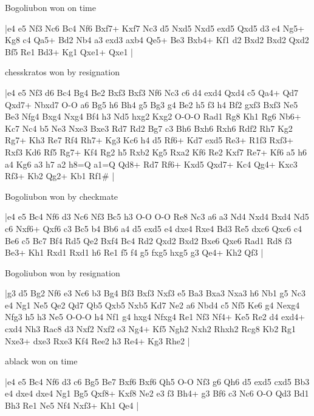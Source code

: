 \showboard

Bogoliubon won on time

\makegametitle
|e4 e5 Nf3 Nc6 Bc4 Nf6 Bxf7+ Kxf7 Nc3 d5 Nxd5 Nxd5 exd5 Qxd5 d3 e4 Ng5+ Kg8 c4 Qa5+ Bd2 Nb4 a3 exd3 axb4 Qe5+ Be3 Bxb4+ Kf1 d2 Bxd2 Bxd2 Qxd2 Bf5 Re1 Bd3+ Kg1 Qxe1+ Qxe1  |

\showboard

chesskratos won by resignation

\makegametitle
|e4 e5 Nf3 d6 Bc4 Bg4 Be2 Bxf3 Bxf3 Nf6 Nc3 c6 d4 exd4 Qxd4 c5 Qa4+ Qd7 Qxd7+ Nbxd7 O-O a6 Bg5 h6 Bh4 g5 Bg3 g4 Be2 h5 f3 h4 Bf2 gxf3 Bxf3 Ne5 Be3 Nfg4 Bxg4 Nxg4 Bf4 h3 Nd5 hxg2 Kxg2 O-O-O Rad1 Rg8 Kh1 Rg6 Nb6+ Kc7 Nc4 b5 Ne3 Nxe3 Bxe3 Rd7 Rd2 Bg7 c3 Bh6 Bxh6 Rxh6 Rdf2 Rh7 Kg2 Rg7+ Kh3 Re7 Rf4 Rh7+ Kg3 Kc6 h4 d5 Rf6+ Kd7 exd5 Re3+ R1f3 Rxf3+ Rxf3 Kd6 Rf5 Rg7+ Kf4 Rg2 h5 Rxb2 Kg5 Rxa2 Kf6 Re2 Kxf7 Re7+ Kf6 a5 h6 a4 Kg6 a3 h7 a2 h8=Q a1=Q Qd8+ Rd7 Rf6+ Kxd5 Qxd7+ Kc4 Qg4+ Kxc3 Rf3+ Kb2 Qg2+ Kb1 Rf1\#  |

\showboard

Bogoliubon won by checkmate

\makegametitle
|e4 e5 Bc4 Nf6 d3 Nc6 Nf3 Bc5 h3 O-O O-O Re8 Nc3 a6 a3 Nd4 Nxd4 Bxd4 Nd5 c6 Nxf6+ Qxf6 c3 Bc5 b4 Bb6 a4 d5 exd5 e4 dxe4 Rxe4 Bd3 Re5 dxc6 Qxc6 c4 Be6 c5 Bc7 Bf4 Rd5 Qe2 Bxf4 Bc4 Rd2 Qxd2 Bxd2 Bxe6 Qxe6 Rad1 Rd8 f3 Be3+ Kh1 Rxd1 Rxd1 h6 Re1 f5 f4 g5 fxg5 hxg5 g3 Qe4+ Kh2 Qf3  |

\showboard

Bogoliubon won by resignation

\makegametitle
|g3 d5 Bg2 Nf6 e3 Nc6 b3 Bg4 Bf3 Bxf3 Nxf3 e5 Ba3 Bxa3 Nxa3 h6 Nb1 g5 Nc3 e4 Ng1 Ne5 Qe2 Qd7 Qb5 Qxb5 Nxb5 Kd7 Ne2 a6 Nbd4 c5 Nf5 Ke6 g4 Nexg4 Nfg3 h5 h3 Ne5 O-O-O h4 Nf1 g4 hxg4 Nfxg4 Re1 Nf3 Nf4+ Ke5 Re2 d4 exd4+ cxd4 Nh3 Rac8 d3 Nxf2 Nxf2 e3 Ng4+ Kf5 Ngh2 Nxh2 Rhxh2 Rcg8 Kb2 Rg1 Nxe3+ dxe3 Rxe3 Kf4 Ree2 h3 Re4+ Kg3 Rhe2  |

\showboard

ablack won on time

\makegametitle
|e4 e5 Bc4 Nf6 d3 c6 Bg5 Be7 Bxf6 Bxf6 Qh5 O-O Nf3 g6 Qh6 d5 exd5 cxd5 Bb3 e4 dxe4 dxe4 Ng1 Bg5 Qxf8+ Kxf8 Ne2 e3 f3 Bh4+ g3 Bf6 c3 Nc6 O-O Qd3 Bd1 Bh3 Re1 Ne5 Nf4 Nxf3+ Kh1 Qe4  |

